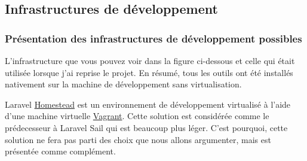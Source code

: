 \documentclass[
    iai, %
    il, %
]{heig-tb}
\begin{document}
\subsection{Infrastructures de développement}

\subsubsection{Présentation des infrastructures de développement possibles}
L'infrastructure que vous pouvez voir dans la figure ci-dessous et celle qui était utilisée lorsque j'ai reprise le projet.\newline
En résumé, tous les outils ont été installés nativement sur la machine de développement sans virtualisation. %
{}



Laravel \href{https://laravel.com/docs/9.x/homestead}{Homestead} est un environnement de développement virtualisé à l'aide d'une machine virtuelle \href{https://www.vagrantup.com/}{Vagrant}.\newline
Cette solution est considérée comme le prédecesseur à Laravel Sail qui est beaucoup plus léger.\newline
C'est pourquoi, cette solution ne fera pas parti des choix que nous allons argumenter, mais est présentée comme complément.



\clearpage
\end{document}
